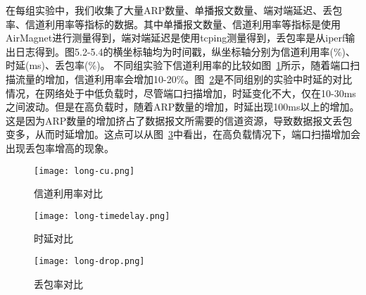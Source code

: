 

在每组实验中，我们收集了大量ARP数量、单播报文数量、端对端延迟、丢包率、信道利用率等指标的数据。其中单播报文数量、信道利用率等指标是使用AirMagnet\cite{airmagnet}进行测量得到，端对端延迟是使用tcping测量得到，丢包率是从iperf输出日志得到。图5.2-5.4的横坐标轴均为时间戳，纵坐标轴分别为信道利用率(\%)、时延(ms)、丢包率(\%)。
不同组实验下信道利用率的比较如图~\ref{fig:信道利用率对比}所示，随着端口扫描流量的增加，信道利用率会增加10-20\%。图~\ref{fig:时延对比}是不同组别的实验中时延的对比情况，在网络处于中低负载时，尽管端口扫描增加，时延变化不大，仅在10-30ms之间波动。但是在高负载时，随着ARP数量的增加，时延出现100ms以上的增加。这是因为ARP数量的增加挤占了数据报文所需要的信道资源，导致数据报文丢包变多，从而时延增加。这点可以从图~\ref{fig:丢包率对比}中看出，在高负载情况下，端口扫描增加会出现丢包率增高的现象。
\begin{figure}
  \centering
  \texttt{[image: long-cu.png]}
  \caption{信道利用率对比}
  \label{fig:信道利用率对比}
\end{figure}

\begin{figure}
  \centering
  \texttt{[image: long-timedelay.png]}
  \caption{时延对比}
  \label{fig:时延对比}
\end{figure}

\begin{figure}
  \centering
  \texttt{[image: long-drop.png]}
  \caption{丢包率对比}
  \label{fig:丢包率对比}
\end{figure}


